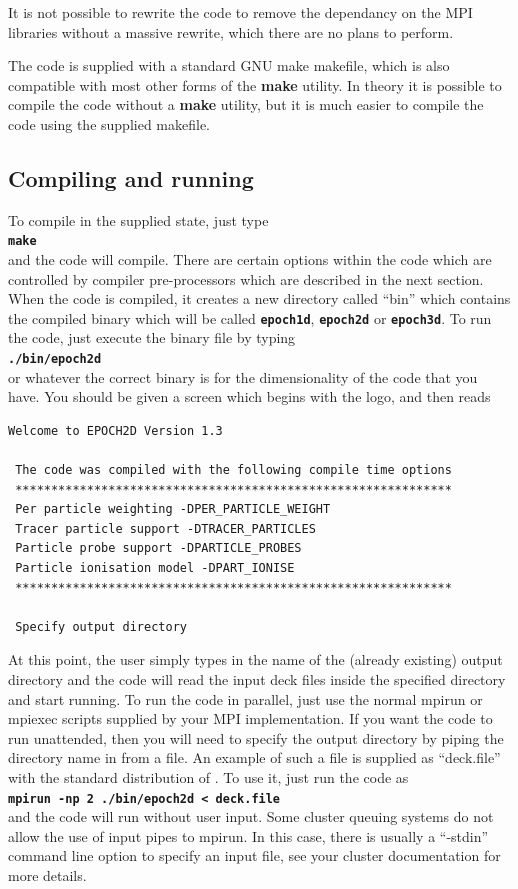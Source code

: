\documentclass[12pt,a4paper]{article}
\newcommand{\simpleboxverbatim}{\begin{Verbatim}[obeytabs=true,frame=single,
  framerule=0.5mm,rulecolor=\color{warwickmid},formatcom=\color{black}]}
\newcommand{\inlinecode}[1]{{\color{warwickred} \bf\texttt{#1}}}
\newcommand{\EPOCH}{{\color{warwickdark}\fontfamily{phv}\selectfont{EPOCH}}}
\begin{document}
It is not possible to rewrite the code to remove the dependancy on the MPI
libraries without a massive rewrite, which there are no plans to perform.

The code is supplied with a standard GNU make makefile, which is also
compatible with most other forms of the {\bf make} utility. In theory it is
possible to compile the code without a {\bf make} utility, but it is much
easier to compile the code using the supplied makefile.

\subsection{Compiling and running {\EPOCH}}

To compile {\EPOCH} in the supplied state, just type\\
\inlinecode{make}\\
and the code will compile. There are certain options within the code which are
controlled by compiler pre-processors which are described in the next
section. When the code is compiled, it creates a new directory called ``bin''
which contains the compiled binary which will be called \inlinecode{epoch1d},
\inlinecode{epoch2d} or \inlinecode{epoch3d}. To run the code, just execute the
binary file by typing\\
\inlinecode{./bin/epoch2d}\\
or whatever the correct binary is for the dimensionality of the code that you
have. You should be given a screen which begins with the {\EPOCH} logo, and then
reads\\

\simpleboxverbatim
Welcome to EPOCH2D Version 1.3

 The code was compiled with the following compile time options
 *************************************************************
 Per particle weighting -DPER_PARTICLE_WEIGHT
 Tracer particle support -DTRACER_PARTICLES
 Particle probe support -DPARTICLE_PROBES
 Particle ionisation model -DPART_IONISE
 *************************************************************

 Specify output directory
\end{Verbatim}

At this point, the user simply types in the name of the (already existing)
output directory and the code will read the input deck files inside the
specified directory and start running. To run the code in parallel, just use
the normal mpirun or mpiexec scripts supplied by your MPI implementation. If
you want the code to run unattended, then you will need to specify the output
directory by piping the directory name in from a file. An example of such a
file is supplied as ``deck.file'' with the standard distribution of \EPOCH. To
use it, just run the code as\\
\inlinecode{mpirun -np 2 ./bin/epoch2d < deck.file}\\
and the code will run without user input. Some cluster queuing systems do not
allow the use of input pipes to mpirun. In this case, there is usually a
``-stdin'' command line option to specify an input file, see your cluster
documentation for more details.
\end{document}
